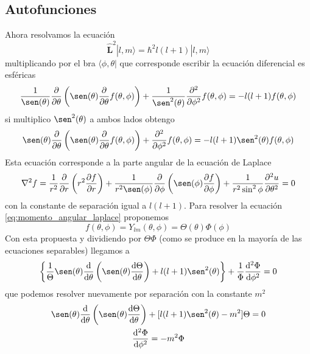 \subsection{Autofunciones}
Ahora resolvamos la ecuación 
\begin{equation}
    \hat{\boldsymbol{L}}^2 |l,m\rangle = \hbar^2 l(l + 1) |l, m\rangle
\end{equation}
multiplicando por el bra $\langle \phi, \theta|$ que corresponde escribir la ecuación diferencial es esféricas
\begin{equation}
    \frac{1}{\sen(\theta)} \frac{\partial}{\partial \theta} \left(\sen(\theta) \frac{\partial}{\partial \theta} f(\theta, \phi) \right) + \frac{1}{\sen^2(\theta)} \frac{\partial^2}{\partial \phi^2} f(\theta, \phi) = - l (l + 1) f(\theta, \phi)
\end{equation}
si multiplico $\sen^2(\theta)$ a ambos lados obtengo
\begin{equation}
    \sen(\theta) \frac{\partial}{\partial \theta} \left(\sen(\theta) \frac{\partial}{\partial \theta} f(\theta, \phi) \right) +  \frac{\partial^2}{\partial \phi^2} f(\theta, \phi) =  -  l (l + 1) \sen^2(\theta) f(\theta, \phi)
    \label{eq:momento_angular_laplace}
\end{equation}
Esta ecuación corresponde a la parte angular de la ecuación de Laplace
\begin{equation}
    \nabla^2 f = \frac{1}{r^2} \frac{\partial}{\partial r}\left( r^2 \frac{\partial f}{\partial r} \right) + \frac{1}{r^2 \sen(\phi)} \frac{\partial}{\partial \phi} \left( \sen(\phi) \frac{\partial f}{ \partial \phi} \right) + \frac{1}{r^2 \sin^2 \phi} \frac{\partial^2 u}{\partial \theta^2} = 0
\end{equation}
con la constante de separación igual a $l(l + 1)$.
Para resolver la ecuación \ref{eq:momento_angular_laplace} proponemos
\begin{equation}
    f(\theta, \phi) = Y_{l m}(\theta, \phi) = \Theta(\theta) \Phi(\phi)
\end{equation}
Con esta propuesta y dividiendo por $\Theta \Phi$ (como se produce en la mayoría de las ecuaciones separables) llegamos  a 
\begin{equation}
    \left\{ \frac{1}{\Theta} \sen(\theta) \frac{\mathrm{d}}{\mathrm{d}\theta} \left(\sen(\theta) \frac{\mathrm{d}\Theta}{\mathrm{d}\theta}\right) + l (l + 1) \sen^2(\theta) \right\} + \frac{1}{\Phi} \frac{\mathrm{d}^2 \Phi}{\mathrm{d}\phi^2} = 0
\end{equation}
que podemos resolver nuevamente por separación con la constante $m^2$
\begin{equation}
    \begin{gathered}
    \sen(\theta) \frac{\mathrm{d}}{\mathrm{d}\theta} \left(\sen(\theta) \frac{\mathrm{d}\Theta}{\mathrm{d}\theta}\right) + [l (l + 1) \sen^2(\theta) - m^2] \Theta = 0 \\ 
    \frac{\mathrm{d}^2 \Phi}{\mathrm{d}\phi^2} = - m^2 \Phi
\end{gathered}
\end{equation}

